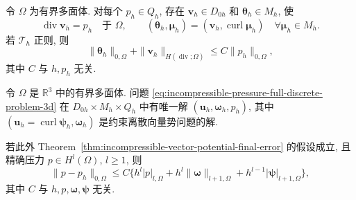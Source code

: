 \begin{Lemma}\label{lem:incompressible-pressure-inf-sup-3d}
令 $\Omega$ 为有界多面体. 对每个 $p_h\in Q_h$,
存在 $\mathbf v_h\in D_{0h}$ 和
$\boldsymbol\theta_h\in M_h$, 使
\[
\operatorname{div}\mathbf v_h=p_h\quad\text{于 }\Omega,
\qquad
(\boldsymbol\theta_h,\boldsymbol\mu_h)
=(\mathbf v_h,\operatorname{curl}\boldsymbol\mu_h)
\quad\forall\boldsymbol\mu_h\in M_h.
\]
若 $\mathcal T_h$ 正则, 则
\begin{equation}\label{eq:incompressible-pressure-inf-sup-3d}
\|\boldsymbol\theta_h\|_{0,\Omega}
+\|\mathbf v_h\|_{H(\operatorname{div};\Omega)}
\leq C\|p_h\|_{0,\Omega},
\end{equation}
其中 $C$ 与 $h,p_h$ 无关.
\end{Lemma}

\begin{Theorem}\label{thm:incompressible-pressure-final-error-3d}
令 $\Omega$ 是 $\mathbb R^3$ 中的有界多面体.
问题 \eqref{eq:incompressible-pressure-full-discrete-problem-3d}
在 $D_{0h}\times M_h\times Q_h$ 中有唯一解
$(\mathbf u_h,\boldsymbol\omega_h,p_h)$,
其中 $(\mathbf u_h=\operatorname{curl}\boldsymbol\psi_h,
\boldsymbol\omega_h)$ 是约束离散向量势问题的解.

若此外 Theorem~\ref{thm:incompressible-vector-potential-final-error}
的假设成立, 且精确压力 $p\in H^l(\Omega)$, $l\geq1$, 则
\begin{equation}\label{eq:incompressible-pressure-final-error-3d}
\|p-p_h\|_{0,\Omega}
\leq C\{h^l|p|_{l,\Omega}
+h^l\|\boldsymbol\omega\|_{l+1,\Omega}
+h^{l-1}|\boldsymbol\psi|_{l+1,\Omega}\},
\end{equation}
其中 $C$ 与 $h,p,\boldsymbol\omega,\boldsymbol\psi$ 无关.
\end{Theorem}
